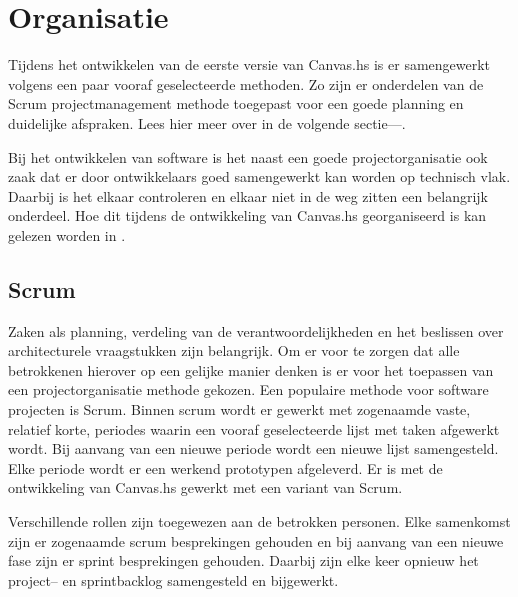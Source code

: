 \chapter{Organisatie} \label{hoofdstuk:organisatie}
Tijdens het ontwikkelen van de eerste versie van Canvas.hs is er samengewerkt volgens een paar vooraf geselecteerde methoden. Zo zijn er onderdelen van de Scrum projectmanagement methode toegepast voor een goede planning en duidelijke afspraken. Lees hier meer over in de volgende sectie—.

Bij het ontwikkelen van software is het naast een goede projectorganisatie ook zaak dat er door ontwikkelaars goed samengewerkt kan worden op technisch vlak. Daarbij is het elkaar controleren en elkaar niet in de weg zitten een belangrijk onderdeel. Hoe dit tijdens de ontwikkeling van Canvas.hs georganiseerd is kan gelezen worden in .

\section{Scrum} \label{sec:scrum}
Zaken als planning, verdeling van de verantwoordelijkheden en het beslissen over architecturele vraagstukken zijn belangrijk. Om er voor te zorgen dat alle betrokkenen hierover op een gelijke manier denken is er voor het toepassen van een projectorganisatie methode gekozen. Een populaire methode voor software projecten is Scrum. Binnen scrum wordt er gewerkt met zogenaamde vaste, relatief korte, periodes waarin een vooraf geselecteerde lijst met taken afgewerkt wordt. Bij aanvang van een nieuwe periode wordt een nieuwe lijst samengesteld. Elke periode wordt er een werkend prototypen afgeleverd. Er is met de ontwikkeling van Canvas.hs gewerkt met een variant van Scrum.

Verschillende rollen zijn toegewezen aan de betrokken personen. Elke samenkomst zijn er zogenaamde scrum besprekingen gehouden en bij aanvang van een nieuwe fase zijn er sprint besprekingen gehouden. Daarbij zijn elke keer opnieuw het project– en sprintbacklog samengesteld en bijgewerkt.

